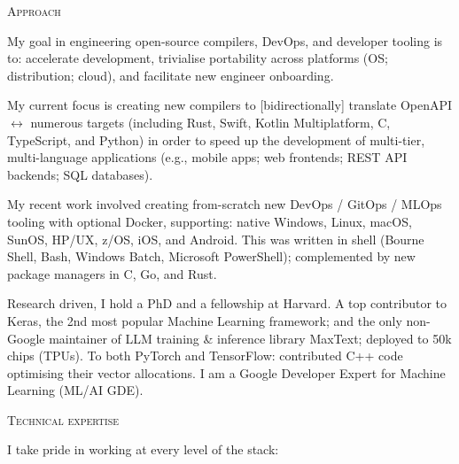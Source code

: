 \documentclass[11pt, a4paper]{article}
\newcommand{\headright}[1]{\vspace*{2.5ex}\textsc{\Large\color{cvblue}#1}\par%
     \vspace*{-2ex}{\color{cvblue}\hrulefill}\par}
\begin{document}
\begin{minipage}[t]{0.56\textwidth}
\setlength{\parskip}{0.8ex}%

\vspace{2ex}
\hypersetup{urlcolor=black}
\hypersetup{linkcolor=black}

\headright{Approach}
My goal in engineering open-source compilers, DevOps, and developer tooling is to: accelerate development, trivialise portability across platforms (OS; distribution; cloud), and facilitate new engineer onboarding.

My current focus is creating new compilers to [bidirectionally] translate OpenAPI \(\leftrightarrow\) numerous targets (including Rust, Swift, Kotlin Multiplatform, C, TypeScript, and Python) in order to speed up the development of multi-tier, multi-language applications (e.g., mobile apps; web frontends; REST API backends; SQL databases).

My recent work involved creating from-scratch new DevOps / GitOps / MLOps tooling with optional Docker, supporting: native Windows, Linux, macOS, SunOS, HP/UX, z/OS, iOS, and Android.  This was written in shell (Bourne Shell, Bash, Windows Batch, Microsoft PowerShell); complemented by new package managers in C, Go, and Rust.

Research driven, I hold a PhD and a fellowship at Harvard. A top contributor to Keras, the 2nd most popular Machine Learning framework; and the only non-Google maintainer of LLM training \& inference library MaxText; deployed to 50k chips (TPUs). To both PyTorch and TensorFlow: contributed C++ code optimising their vector allocations. I am a Google Developer Expert for Machine Learning (ML/AI GDE).

\headright{Technical expertise}
I take pride in working at every level of the stack:


\end{minipage}
\end{document}
